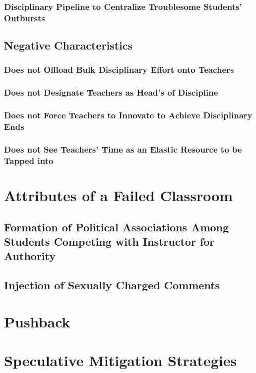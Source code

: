\documentclass[12pt]{article}
\begin{document}
  \subsubsection{Disciplinary Pipeline to Centralize Troublesome Students' Outbursts}
  \subsection{Negative Characteristics}
  \subsubsection{Does not Offload Bulk Disciplinary Effort onto Teachers}
  \subsubsection{Does not Designate Teachers as Head's of Discipline}
  \subsubsection{Does not Force Teachers to Innovate to Achieve Disciplinary Ends}
  \subsubsection{Does not See Teachers' Time as an Elastic Resource to be Tapped into}

  \section{Attributes of a Failed Classroom}
  \subsection{Formation of Political Associations Among Students Competing with Instructor for Authority}
  \subsection{Injection of Sexually Charged Comments}

  \section{Pushback}

  \section{Speculative Mitigation Strategies}
\end{document}
